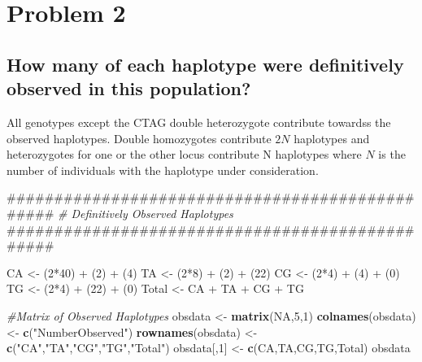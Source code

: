 \documentclass[]{article}
\newenvironment{Shaded}{\begin{snugshade}}{\end{snugshade}}
\newcommand{\KeywordTok}[1]{\textcolor[rgb]{0.13,0.29,0.53}{\textbf{{#1}}}}
\newcommand{\DecValTok}[1]{\textcolor[rgb]{0.00,0.00,0.81}{{#1}}}
\newcommand{\StringTok}[1]{\textcolor[rgb]{0.31,0.60,0.02}{{#1}}}
\newcommand{\CommentTok}[1]{\textcolor[rgb]{0.56,0.35,0.01}{\textit{{#1}}}}
\newcommand{\OtherTok}[1]{\textcolor[rgb]{0.56,0.35,0.01}{{#1}}}
\newcommand{\NormalTok}[1]{{#1}}
\begin{document}
\pagebreak

\section{Problem 2}\label{problem-2}

\subsection{How many of each haplotype were definitively observed in
this
population?}\label{how-many-of-each-haplotype-were-definitively-observed-in-this-population}

All genotypes except the CTAG double heterozygote contribute towardss
the observed haplotypes. Double homozygotes contribute $2N$ haplotypes
and heterozygotes for one or the other locus contribute N haplotypes
where $N$ is the number of individuals with the haplotype under
consideration.

\begin{Shaded}
\begin{Highlighting}[]
\NormalTok{################################################}
\CommentTok{# Definitively Observed Haplotypes}
\NormalTok{################################################}

\NormalTok{CA <-}\StringTok{ }\NormalTok{(}\DecValTok{2}\NormalTok{*}\DecValTok{40}\NormalTok{) +}\StringTok{ }\NormalTok{(}\DecValTok{2}\NormalTok{) +}\StringTok{ }\NormalTok{(}\DecValTok{4}\NormalTok{) }
\NormalTok{TA <-}\StringTok{ }\NormalTok{(}\DecValTok{2}\NormalTok{*}\DecValTok{8}\NormalTok{) +}\StringTok{ }\NormalTok{(}\DecValTok{2}\NormalTok{) +}\StringTok{ }\NormalTok{(}\DecValTok{22}\NormalTok{)}
\NormalTok{CG <-}\StringTok{ }\NormalTok{(}\DecValTok{2}\NormalTok{*}\DecValTok{4}\NormalTok{) +}\StringTok{ }\NormalTok{(}\DecValTok{4}\NormalTok{) +}\StringTok{ }\NormalTok{(}\DecValTok{0}\NormalTok{)}
\NormalTok{TG <-}\StringTok{ }\NormalTok{(}\DecValTok{2}\NormalTok{*}\DecValTok{4}\NormalTok{) +}\StringTok{ }\NormalTok{(}\DecValTok{22}\NormalTok{) +}\StringTok{ }\NormalTok{(}\DecValTok{0}\NormalTok{)}
\NormalTok{Total <-}\StringTok{ }\NormalTok{CA +}\StringTok{ }\NormalTok{TA +}\StringTok{ }\NormalTok{CG +}\StringTok{ }\NormalTok{TG}

\CommentTok{#Matrix of Observed Haplotypes}
\NormalTok{obsdata <-}\StringTok{ }\KeywordTok{matrix}\NormalTok{(}\OtherTok{NA}\NormalTok{,}\DecValTok{5}\NormalTok{,}\DecValTok{1}\NormalTok{)}
\KeywordTok{colnames}\NormalTok{(obsdata) <-}\StringTok{ }\KeywordTok{c}\NormalTok{(}\StringTok{"NumberObserved"}\NormalTok{)}
\KeywordTok{rownames}\NormalTok{(obsdata) <-}\StringTok{ }\KeywordTok{c}\NormalTok{(}\StringTok{"CA"}\NormalTok{,}\StringTok{"TA"}\NormalTok{,}\StringTok{"CG"}\NormalTok{,}\StringTok{"TG"}\NormalTok{,}\StringTok{"Total"}\NormalTok{)}
\NormalTok{obsdata[,}\DecValTok{1}\NormalTok{] <-}\StringTok{ }\KeywordTok{c}\NormalTok{(CA,TA,CG,TG,Total)}
\NormalTok{obsdata}
\end{Highlighting}
\end{Shaded}
\end{document}
